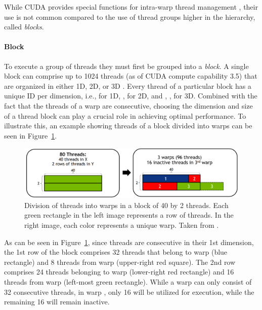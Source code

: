 While CUDA provides special functions for intra-warp thread management \cite{Grover15January2018}, their use is not common compared to the use of thread groups higher in the hierarchy, called \textit{blocks}.

\paragraph{Block} To execute a group of threads they must first be grouped into a \textit{block}.
A single block can comprise up to 1024 threads (as of CUDA compute capability 3.5) that are organized in either 1D, 2D, or 3D \cite{NVIDIADecember2022}.
Every thread of a particular block has a unique ID per dimension, i.e.,  for 1D, ,  for 2D, and , ,  for 3D.
Combined with the fact that the threads of a warp are consecutive, choosing the dimension and size of a thread block can play a crucial role in achieving optimal performance.
To illustrate this, an example showing threads of a block divided into warps can be seen in Figure~\ref{Figure:theory->CUDA->thread-management->grouping-threads-in-block-into-warps}.

\begin{figure}[ht!]
	\centering
	\includegraphics[width=\textwidth, keepaspectratio]{images/ch01/CUDA_threads_in_warp_and_block.png}
	\caption{Division of threads into warps in a block of 40 by 2 threads.
		Each green rectangle in the left image represents a row of threads.
		In the right image, each color represents a unique warp.
		Taken from  \cite{ThomasCollignon2018}.
	}
	\label{Figure:theory->CUDA->thread-management->grouping-threads-in-block-into-warps}
\end{figure}

As can be seen in Figure~\ref{Figure:theory->CUDA->thread-management->grouping-threads-in-block-into-warps}, since threads are consecutive in their 1st dimension, the 1st row of the block comprises 32 threads that belong to warp  (blue rectangle) and 8 threads from warp  (upper-right red square).
The 2nd row comprises 24 threads belonging to warp  (lower-right red rectangle) and 16 threads from warp  (left-most green rectangle).
While a warp can only consist of 32 consecutive threads, in warp , only 16 will be utilized for execution, while the remaining 16 will remain inactive.

